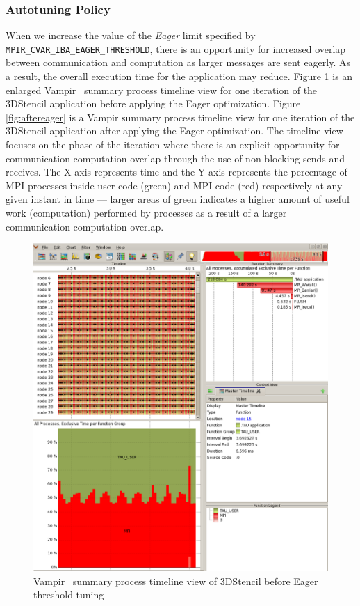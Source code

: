 \subsubsection{Autotuning Policy}
When we increase the value of the \emph{Eager} limit specified by \verb+MPIR_CVAR_IBA_EAGER_THRESHOLD+, there is an opportunity for increased overlap between communication and computation as larger messages are sent eagerly. As a result, the overall execution time for the application may reduce. Figure \ref{fig:beforeeager} is an enlarged Vampir~\cite{Vampir} summary process timeline view for one iteration of the 3DStencil application before applying the Eager optimization. Figure \ref{fig:aftereager} is a Vampir summary process timeline view for one iteration of the 3DStencil application after applying the Eager optimization. The timeline view focuses on the phase of the iteration where there is an explicit opportunity for communication-computation overlap through the use of non-blocking sends and receives. The X-axis represents time and the Y-axis represents the percentage of MPI processes inside user code (green) and MPI code (red) respectively at any given instant in time --- larger areas of green indicates a higher amount of useful work (computation) performed by processes as a result of a larger communication-computation overlap. 

 \begin{figure}[tbp!]
  \centering
  \captionsetup{justification=centering}
  \includegraphics[scale=1.0,width=\columnwidth,keepaspectratio]{figures/Overlap-before}
         \caption{Vampir~\cite{Vampir} summary process timeline view of 3DStencil before Eager threshold tuning}
 \label{fig:beforeeager}
 \end{figure}

